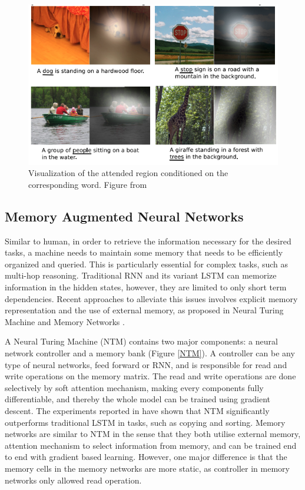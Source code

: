 \documentclass[journal]{IEEEtran}
\begin{document}
\begin{figure}[htb]
  \includegraphics[width=\linewidth]{attention.png}
  \caption{Visualization of the attended region conditioned on the corresponding word.
  Figure from \cite{xu2015show}}
  \label{attention}
\end{figure}

\subsection{Memory Augmented Neural Networks}
Similar to human, in order to retrieve the information necessary for the desired tasks, a machine needs to maintain some memory that needs to be efficiently organized and queried. 
This is particularly essential for complex tasks, such as multi-hop reasoning. Traditional RNN and its variant LSTM can memorize information in the hidden states,
however, they are limited to only short term dependencies. Recent approaches to alleviate this issues involves explicit memory representation and the use of external memory, 
as proposed in Neural Turing Machine \cite{graves2014neural} and Memory Networks \cite{weston2014memory}.

A Neural Turing Machine (NTM) contains two major components: a neural network controller and a memory bank (Figure \ref{NTM}). 
A controller can be any type of neural networks, feed forward or RNN, and is responsible for read and write operations on the memory matrix.
The read and write operations are done selectively by soft attention mechanism, making every components fully differentiable, 
and thereby the whole model can be trained using gradient descent. The experiments reported in \cite{graves2014neural} have shown that NTM significantly
outperforms traditional LSTM in tasks, such as copying and sorting. Memory networks \cite{graves2014neural} are similar to NTM in the sense that they both utilise external memory, attention mechanism to select information from memory, and
can be trained end to end with gradient based learning. However, one major difference is that the memory cells in the memory networks are more static, 
as controller in memory networks only allowed read operation.
\end{document}
